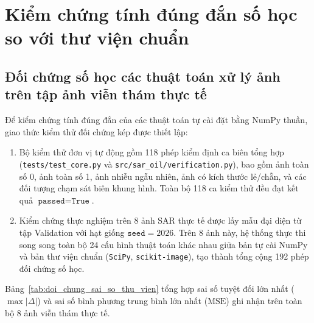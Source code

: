\section{Kiểm chứng tính đúng đắn số học so với thư viện chuẩn}
\label{sec:kiem_chung_thu_vien}

\subsection{Đối chứng số học các thuật toán xử lý ảnh trên tập ảnh viễn thám thực tế}

Để kiểm chứng tính đúng đắn của các thuật toán tự cài đặt bằng NumPy thuần, giao thức kiểm thử đối chứng kép được thiết lập:
\begin{enumerate}
    \item Bộ kiểm thử đơn vị tự động gồm 118 phép kiểm định ca biên tổng hợp (\texttt{tests/test\_core.py} và \texttt{src/sar\_oil/verification.py}), bao gồm ảnh toàn số 0, ảnh toàn số 1, ảnh nhiễu ngẫu nhiên, ảnh có kích thước lẻ/chẵn, và các đối tượng chạm sát biên khung hình. Toàn bộ 118 ca kiểm thử đều đạt kết quả $\texttt{passed} = \texttt{True}$.
    \item Kiểm chứng thực nghiệm trên 8 ảnh SAR thực tế được lấy mẫu đại diện từ tập Validation với hạt giống $\texttt{seed} = 2026$. Trên 8 ảnh này, hệ thống thực thi song song toàn bộ 24 cấu hình thuật toán khác nhau giữa bản tự cài NumPy và bản thư viện chuẩn (\texttt{SciPy}, \texttt{scikit-image}), tạo thành tổng cộng 192 phép đối chứng số học.
\end{enumerate}

Bảng~\ref{tab:doi_chung_sai_so_thu_vien} tổng hợp sai số tuyệt đối lớn nhất ($\max |\Delta|$) và sai số bình phương trung bình lớn nhất ($\text{MSE}$) ghi nhận trên toàn bộ 8 ảnh viễn thám thực tế.

